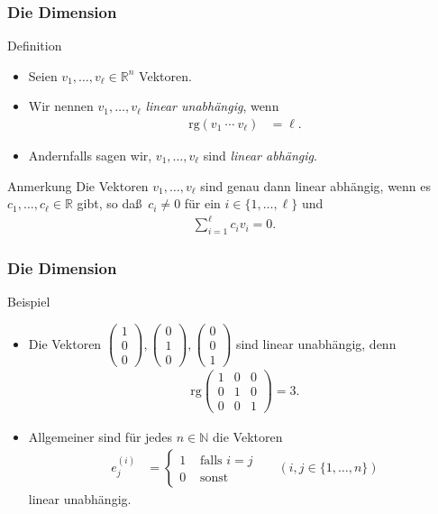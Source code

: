 \documentclass{beamer}
\renewcommand{\emph}[1]{{\textcolor{solarizedRed}{\itshape #1}}}
\newcommand\NN{\mathbb N}
\newcommand\RR{\mathbb R}
\renewcommand{\ae}{\"a}
\newcommand{\ue}{\"u}
\newcommand{\rk}{\mathrm{rg}}
\newcommand{\mytitle}{Die Dimension}
\begin{document}
\begin{frame}\frametitle{\mytitle}
	\begin{block}{Definition}
		\begin{itemize}
			\item Seien $v_1,\ldots,v_\ell\in\RR^n$ Vektoren.
			\item Wir nennen $v_1,\ldots,v_\ell$ \emph{linear unabh\ae ngig}, wenn
				\begin{align*}
					\rk(v_1\ \cdots\ v_\ell)&=\ell.
				\end{align*}
			\item Andernfalls sagen wir, $v_1,\ldots,v_\ell$ sind \emph{linear abh\ae ngig}.
		\end{itemize}
	\end{block}
	\begin{block}{Anmerkung}
		Die Vektoren $v_1,\ldots,v_\ell$ sind genau dann linear abh\ae ngig, wenn es $c_1,\ldots,c_\ell\in\RR$ gibt, so da\ss\ $c_i\neq0$ f\ue r ein $i\in\{1,\ldots,\ell\}$ und
		\begin{align*}
			\sum_{i=1}^\ell c_iv_i=0.
		\end{align*}
	\end{block}
\end{frame}

\begin{frame}\frametitle{\mytitle}
	\begin{block}{Beispiel}
		\begin{itemize}
			\item Die Vektoren $\begin{pmatrix}1\\0\\0\end{pmatrix},\begin{pmatrix}0\\1\\0\end{pmatrix},\begin{pmatrix}0\\0\\1\end{pmatrix}$ sind linear unabh\ae ngig, denn
				\begin{align*}
					\rk\begin{pmatrix}1&0&0\\0&1&0\\0&0&1\end{pmatrix}=3.
				\end{align*}
			\item Allgemeiner sind f\ue r jedes $n\in\NN$ die Vektoren
				\begin{align*}
					e^{(i)}_j&=\begin{cases}
						1&\mbox{ falls }i=j\\0&\mbox{ sonst}
					\end{cases}&&(i,j\in\{1,\ldots,n\})
				\end{align*}
				linear unabh\ae ngig.
		\end{itemize}
	\end{block}
\end{frame}
\end{document}
